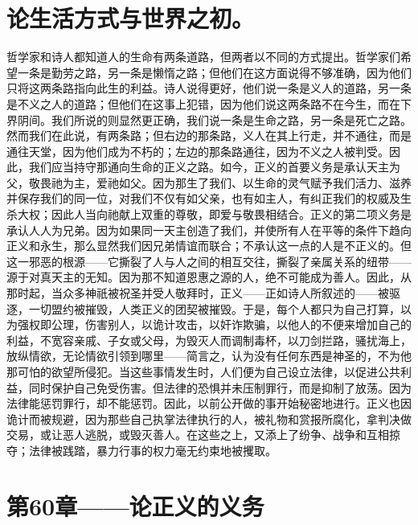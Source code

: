 \section{论生活方式与世界之初。}

哲学家和诗人都知道人的生命有两条道路，但两者以不同的方式提出。哲学家们希望一条是勤劳之路，另一条是懒惰之路；但他们在这方面说得不够准确，因为他们只将这两条路指向此生的利益。诗人说得更好，他们说一条是义人的道路，另一条是不义之人的道路；但他们在这事上犯错，因为他们说这两条路不在今生，而在下界阴间。我们所说的则显然更正确，我们说一条是生命之路，另一条是死亡之路。然而我们在此说，有两条路；但右边的那条路，义人在其上行走，并不通往，而是通往天堂，因为他们成为不朽的；左边的那条路通往，因为不义之人被判受。因此，我们应当持守那通向生命的正义之路。如今，正义的首要义务是承认天主为父，敬畏祂为主，爱祂如父。因为那生了我们、以生命的灵气赋予我们活力、滋养并保存我们的同一位，对我们不仅有如父亲，也有如主人，有纠正我们的权威及生杀大权；因此人当向祂献上双重的尊敬，即爱与敬畏相结合。正义的第二项义务是承认人人为兄弟。因为如果同一天主创造了我们，并使所有人在平等的条件下趋向正义和永生，那么显然我们因兄弟情谊而联合；不承认这一点的人是不正义的。但这一邪恶的根源——它撕裂了人与人之间的相互交往，撕裂了亲属关系的纽带——源于对真天主的无知。因为那不知道恩惠之源的人，绝不可能成为善人。因此，从那时起，当众多神祇被祝圣并受人敬拜时，正义——正如诗人所叙述的——被驱逐，一切盟约被摧毁，人类正义的团契被摧毁。于是，每个人都只为自己打算，以为强权即公理，伤害别人，以诡计攻击，以奸诈欺骗，以他人的不便来增加自己的利益，不宽容亲戚、子女或父母，为毁灭人而调制毒杯，以刀剑拦路，骚扰海上，放纵情欲，无论情欲引领到哪里——简言之，认为没有任何东西是神圣的，不为他那可怕的欲望所侵犯。当这些事情发生时，人们便为自己设立法律，以促进公共利益，同时保护自己免受伤害。但法律的恐惧并未压制罪行，而是抑制了放荡。因为法律能惩罚罪行，却不能惩罚。因此，以前公开做的事开始秘密地进行。正义也因诡计而被规避，因为那些自己执掌法律执行的人，被礼物和赏报所腐化，拿判决做交易，或让恶人逃脱，或毁灭善人。在这些之上，又添上了纷争、战争和互相掠夺；法律被践踏，暴力行事的权力毫无约束地被攫取。\par


\section{第60章——论正义的义务}

